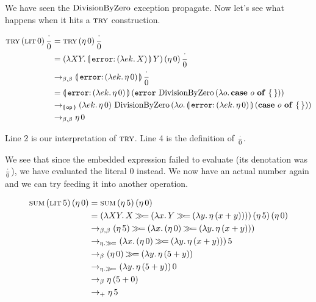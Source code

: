 We have seen the $\operatorname{DivisionByZero}$ exception propagate. Now let's see what
happens when it hits a $\textsc{try}$ construction.

\NoChapterPrefix
\begin{align}
  \app{\trye}{\litec{0}}{\dbze}
  &= \app{\trye}{(\ap{\eta}{0})}{\dbze} \\
  &= \app{(\lam{X Y}{\ap{\banana{\onto{\op{error}}{(\lam{e k}{X})}}}{Y}})}{(\ap{\eta}{0})}{\dbze} \\
  &\to_{\beta,\beta} \ap{\banana{\onto{\op{error}}{(\lam{e k}{\ap{\eta}{0}})}}}{\dbze} \\
  &= \ap{\banana{\onto{\op{error}}{(\lam{e k}{\ap{\eta}{0}})}}}{(\app{\op{error}}{\dbzelong}{(\lam{o}{\absurd{o}})})} \\
  &\to_{\banana{\op{op}}} \app{(\lam{e k}{\ap{\eta}{0}})}{\dbzelong}{(\lam{o}{\ap{\banana{\onto{\op{error}}{(\lam{e k}{\ap{\eta}{0}})}}}{(\absurd{o})}})} \\
  &\to_{\beta,\beta} \ap{\eta}{0}
\end{align}
\setcounter{equation}{0}
\ChapterPrefix

Line 2 is our interpretation of $\textsc{try}$. Line 4 is the definition of
$\frac{\cdot}{0}$.

We see that since the embedded expression failed to evaluate (its
denotation was $\frac{\cdot}{0}$), we have evaluated the literal 0 instead. We now
have an actual number again and we can try feeding it into another
operation.

\NoChapterPrefix
\begin{align}
  \app{\sume}{\litec{5}}{(\ap{\eta}{0})}
  &= \app{\sume}{(\ap{\eta}{5})}{(\ap{\eta}{0})} \\
  &= \app{(\lam{X Y}{X \hsbind (\lam{x}{Y \hsbind (\lam{y}{\ap{\eta}{(x + y)}})})})}{(\ap{\eta}{5})}{(\ap{\eta}{0})} \\
  &\to_{\beta,\beta} (\ap{\eta}{5}) \hsbind (\lam{x}{(\ap{\eta}{0}) \hsbind (\lam{y}{\ap{\eta}{(x + y)}})}) \\
  &\to_{\eta.\hsbind} \ap{(\lam{x}{(\ap{\eta}{0}) \hsbind (\lam{y}{\ap{\eta}{(x + y)}})})}{5} \\
  &\to_{\beta} (\ap{\eta}{0}) \hsbind (\lam{y}{\ap{\eta}{(5 + y)}}) \\
  &\to_{\eta.\hsbind} \ap{(\lam{y}{\ap{\eta}{(5 + y)}})}{0} \\
  &\to_{\beta} \ap{\eta}{(5 + 0)} \\
  &\to_+ \ap{\eta}{5}
\end{align}
\setcounter{equation}{0}
\ChapterPrefix

